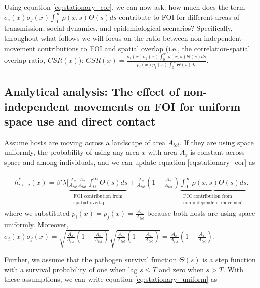 \documentclass[letterpaper]{article}
\begin{document}
Using equation \ref{eq:stationary_cor}, we can now ask: how much does the term $\sigma_i(x) \sigma_j(x) \int_{0}^{\infty} \rho(x, s) \Theta(s) ds$ contribute to FOI for different areas of transmission, social dynamics, and epidemiological scenarios? Specifically, throughout what follows we will focus on the ratio between non-independent movement contributions to FOI and spatial overlap (i.e., the correlation-spatial overlap ratio, $CSR(x)$): $CSR(x) = \frac{\sigma_i(x) \sigma_j(x) \int_{0}^{\infty} \rho(x, s) \Theta(s) ds}{p_i(x) p_j(x) \int_{0}^{\infty} \Theta(s) ds}$.  %

\subsection*{Analytical analysis: The effect of non-independent movements on FOI for uniform space use and direct contact}

Assume hosts are moving across a landscape of area $A_{tot}$. If they are using space uniformly, the probability of using any area $x$ with area $A_x$ is constant across space and among individuals, and we can update equation \ref{eq:stationary_cor} as

\begin{equation}
    \begin{aligned}
    h^*_{i \leftarrow j}(x) = \beta' \lambda [ \underbrace{\frac{A_x}{A_{tot}}\frac{A_x}{A_{tot}} \int_{0}^{\infty} \Theta(s) ds}_{\substack{\text{FOI contribution from} \\ \text{spatial overlap}}} + \frac{A_x}{A_{tot}} (1 - \frac{A_x}{A_{tot}})\underbrace{\int_{0}^{\infty} \rho(x, s) \Theta(s) ds}_{\substack{\text{FOI contribution from} \\ \text{non-independent movement}}}.
    \end{aligned}
    \label{eq:stationary_uniform}
\end{equation}
where we substituted $p_i(x) = p_j(x) = \frac{A_x}{A_{tot}}$ because both hosts are using space uniformly.  Moreover, $\sigma_i(x) \sigma_j(x) = \sqrt{\frac{A_x}{A_{tot}}(1 - \frac{A_x}{A_{tot}})}\sqrt{\frac{A_x}{A_{tot}}(1 - \frac{A_x}{A_{tot}})} = \frac{A_x}{A_{tot}}(1 - \frac{A_x}{A_{tot}})$.

Further, we assume that the pathogen survival function $\Theta(s)$ is a step function with a survival probability of one when lag $s \leq T$ and zero when $s > T$. With these assumptions, we can write equation \ref{eq:stationary_uniform} as
\end{document}
